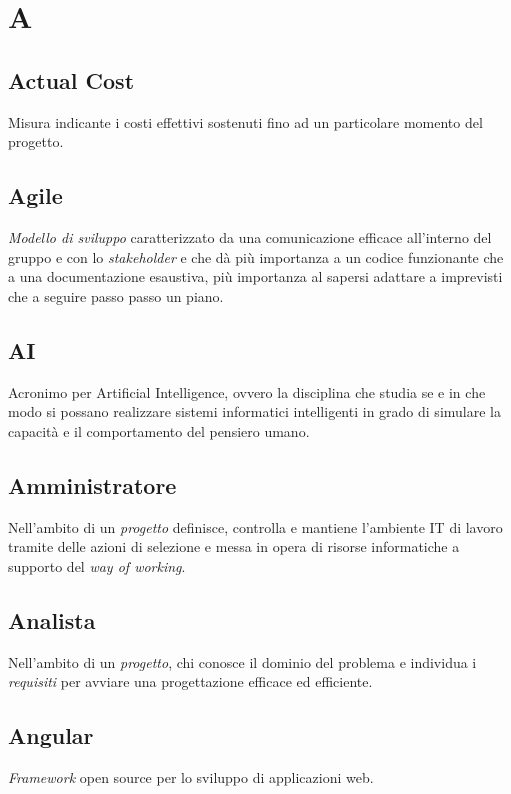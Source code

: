 \chapter{A}

\section{Actual Cost}
Misura indicante i costi effettivi sostenuti fino ad un particolare momento del progetto.

\section{Agile}
\emph{Modello di sviluppo} caratterizzato da una comunicazione efficace all'interno del gruppo e con lo \emph{stakeholder} e che dà più importanza a un codice funzionante che a una documentazione esaustiva, più importanza al sapersi adattare a imprevisti che a seguire passo passo un piano.

\section{AI} \label{sec:Artificial Intelligence}
Acronimo per Artificial Intelligence, ovvero la disciplina che studia se e in che modo si possano realizzare sistemi informatici intelligenti in grado di simulare la capacità e il comportamento del pensiero umano.

\section{Amministratore} \label{sec:Amministratori}
Nell'ambito di un \emph{progetto} definisce, controlla e mantiene l'ambiente IT di lavoro tramite delle azioni di selezione e messa in opera di risorse informatiche a supporto del \emph{way of working}. 

\section{Analista}\label{sec:Analisti}
Nell'ambito di un \emph{progetto}, chi conosce il dominio del problema e individua i \emph{requisiti} per avviare una progettazione efficace ed efficiente.

\section{Angular}
\emph{Framework} open source per lo sviluppo di applicazioni web.

